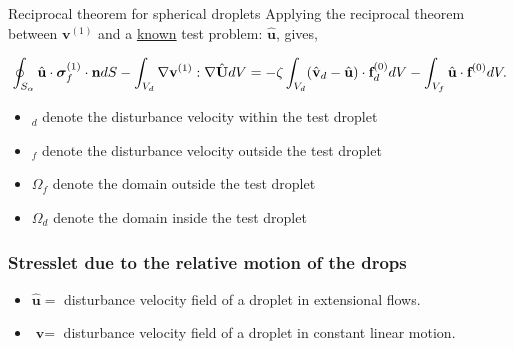 \documentclass{sintefbeamer}
\begin{document}
\begin{frame}{Reciprocal theorem for spherical droplets}
\small
  Applying the reciprocal theorem between $\textbf{v}^{(1)}$ and a \underline{known} test problem: $\hat{\textbf{u}}$, gives, 

  \begin{equation*}
    \intS{\hat{\textbf{u}}\cdot  \bm\sigma_f^{(1)} \cdot \textbf{n}}
    - \intO[d]{
        \grad \textbf{v}^{(1)}:\grad \hat{\textbf{U}} 
   }
    = 
    - \zeta \intO[d]{(\hat{\textbf{v}}_d - \hat{\textbf{u}}) \cdot \textbf{f}_d^{(0)}}
    - \intOf{\hat{\textbf{u}} \cdot  \textbf{f}^{(0)}}. 
\end{equation*}

\begin{itemize}
  \item $ _d$ denote the disturbance velocity within the test droplet
  \item $ _f$ denote the disturbance velocity outside the test droplet
  \item $\Omega_f$ denote the domain outside the test droplet
  \item $\Omega_d$ denote the domain inside the test droplet
\end{itemize}

\end{frame}

\begin{frame}
  \frametitle{Stresslet due to the relative motion of the drops}
  \begin{itemize}
    \item $\hat{\textbf{u}} = $ disturbance velocity field of a droplet in extensional flows. 
    \item $\textbf{v} = $ disturbance velocity field of a droplet in constant linear motion. 
  \end{itemize}
\hfill
{}

\end{frame}
\end{document}
